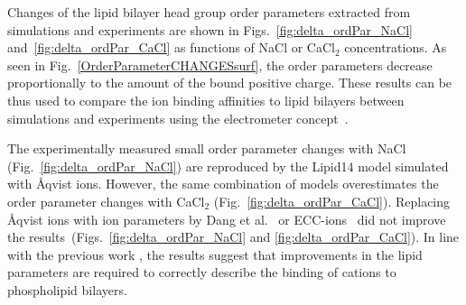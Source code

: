
 
Changes of the lipid bilayer head group order parameters extracted from simulations and 
experiments \citep{akutsu81, altenbach84} are shown in Figs.~\ref{fig:delta_ordPar_NaCl} 
and~\ref{fig:delta_ordPar_CaCl} as functions of NaCl or CaCl$_2$ concentrations. 
As seen in Fig.~\ref{OrderParameterCHANGESsurf}, the order parameters decrease 
proportionally to the amount of the bound positive charge. 
These results can be thus used to compare the ion binding affinities to lipid bilayers between 
simulations and experiments using the electrometer concept~\citep{seelig87, catte16}. 
 
The experimentally measured small order parameter 
changes with NaCl (Fig.~\ref{fig:delta_ordPar_NaCl})  
are reproduced by the Lipid14 model simulated with Åqvist ions. 
However, the same combination of models overestimates the order parameter changes with CaCl$_2$ (Fig.~\ref{fig:delta_ordPar_CaCl}). 
Replacing Åqvist ions with ion parameters by Dang et al.~\citep{smith94, chang1999, dang2006} 
or ECC-ions~\citep{martinek17, kohagen16, Pluharova2014} did not improve 
the results~(Figs.~\ref{fig:delta_ordPar_NaCl} and \ref{fig:delta_ordPar_CaCl}). 
In line with the previous work \citep{catte16}, the results suggest that improvements 
in the lipid parameters are required to correctly describe the binding of cations to phospholipid bilayers. 
 

